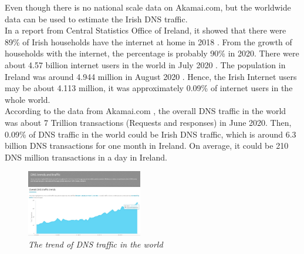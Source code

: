 \documentclass[conference]{IEEEtran}
\begin{document}
Even though there is no national scale data on Akamai.com, but the worldwide data can be used to estimate the Irish DNS traffic.
\\

In a report from Central Statistics Office of Ireland, it showed that there were 89\% of Irish households have the internet at home in 2018 \cite{Irish_households_with_internet}. From the growth of households with the internet, the percentage is probably 90\% in 2020. There were about 4.57 billion internet users in the world in July 2020 \cite{Global_digital_population_July_2020}. The population in Ireland was around 4.944 million in August 2020 \cite{Ireland_population}. Hence, the Irish Internet users may be about 4.113 million, it was approximately 0.09\% of internet users in the whole world.
\\

According to the data from Akamai.com \cite{overall_DNS_traffic_trends}, the overall DNS traffic in the world was about 7 Trillion transactions (Requests and responses) in June 2020. 
Then, 0.09\% of DNS traffic in the world could be Irish DNS traffic, which is around 6.3 billion DNS transactions for one month in Ireland. On average, it could be 210 DNS million transactions in a day in Ireland.
\\

\begin{figure}[hbt!]  
    \centering
    \includegraphics[width=0.45\textwidth]{figure/Overall DNS traffic trends.jpg}
    \caption{\em The trend of DNS traffic in the world \cite{overall_DNS_traffic_trends} \label{fig:trend_DNS_traffic}}
\end{figure}
\end{document}
